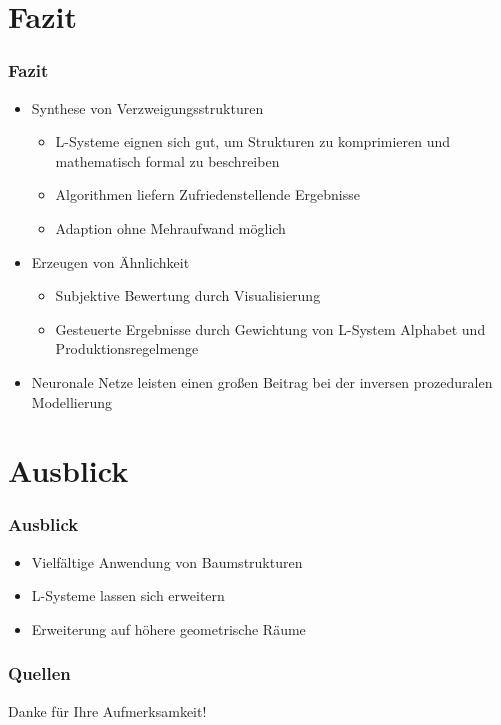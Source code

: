 \documentclass[12pt]{beamer}
\begin{document}
    \section{Fazit}
    \label{sec:fazit}
    \begin{frame}
        \frametitle{Fazit}

        \begin{itemize}
            \setlength\itemsep{1em}
            \item<1-> Synthese von Verzweigungsstrukturen
            \begin{itemize}
                \setlength\itemsep{1em}
                \item L-Systeme eignen sich gut, um Strukturen zu komprimieren und mathematisch formal zu beschreiben
                \item Algorithmen liefern Zufriedenstellende Ergebnisse
                \item Adaption ohne Mehraufwand möglich
            \end{itemize}
            \item<2-> Erzeugen von Ähnlichkeit
            \begin{itemize}
                \setlength\itemsep{1em}
                \item Subjektive Bewertung durch Visualisierung
                \item Gesteuerte Ergebnisse durch Gewichtung von L-System Alphabet und Produktionsregelmenge
            \end{itemize}
            \item<3-> Neuronale Netze leisten einen großen Beitrag bei der inversen prozeduralen Modellierung
        \end{itemize}
    \end{frame}

    \section{Ausblick}
    \label{sec:ausblick}
    \begin{frame}
        \frametitle{Ausblick}

        \begin{itemize}
            \setlength\itemsep{1em}
            \item<1-> Vielfältige Anwendung von Baumstrukturen
            \item<2-> L-Systeme lassen sich erweitern
            \item<3-> Erweiterung auf höhere geometrische Räume
        \end{itemize}
    \end{frame}

    \begin{frame}[t,allowframebreaks]
        \frametitle{Quellen}
        \printbibliography
    \end{frame}

    \begin{frame}
        \begin{center}
            Danke für Ihre Aufmerksamkeit!
        \end{center}
    \end{frame}
\end{document}
